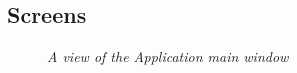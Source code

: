 \subsection{Screens}
\begin{figure}
 
\begin{center}

  \caption{\emph{A view of the Application main window}}
  

\end{center}    
\end{figure}

